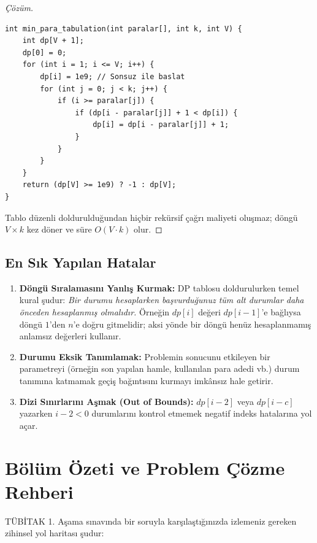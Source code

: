 \begin{proof}[Çözüm]
\begin{lstlisting}[language=CTemel]
int min_para_tabulation(int paralar[], int k, int V) {
    int dp[V + 1];
    dp[0] = 0;
    for (int i = 1; i <= V; i++) {
        dp[i] = 1e9; // Sonsuz ile baslat
        for (int j = 0; j < k; j++) {
            if (i >= paralar[j]) {
                if (dp[i - paralar[j]] + 1 < dp[i]) {
                    dp[i] = dp[i - paralar[j]] + 1;
                }
            }
        }
    }
    return (dp[V] >= 1e9) ? -1 : dp[V];
}
\end{lstlisting}
Tablo düzenli doldurulduğundan hiçbir rekürsif çağrı maliyeti oluşmaz; döngü $V \times k$ kez döner ve süre $O(V \cdot k)$ olur.
\end{proof}

\subsection*{En Sık Yapılan Hatalar}
\begin{enumerate}
    \item \textbf{Döngü Sıralamasını Yanlış Kurmak:} DP tablosu doldurulurken temel kural şudur: \emph{Bir durumu hesaplarken başvurduğunuz tüm alt durumlar daha önceden hesaplanmış olmalıdır.} Örneğin $dp[i]$ değeri $dp[i-1]$'e bağlıysa döngü $1$'den $n$'e doğru gitmelidir; aksi yönde bir döngü henüz hesaplanmamış anlamsız değerleri kullanır.
    \item \textbf{Durumu Eksik Tanımlamak:} Problemin sonucunu etkileyen bir parametreyi (örneğin son yapılan hamle, kullanılan para adedi vb.) durum tanımına katmamak geçiş bağıntısını kurmayı imkânsız hale getirir.
    \item \textbf{Dizi Sınırlarını Aşmak (Out of Bounds):} $dp[i-2]$ veya $dp[i-c]$ yazarken $i-2 < 0$ durumlarını kontrol etmemek negatif indeks hatalarına yol açar.
\end{enumerate}

\section{Bölüm Özeti ve Problem Çözme Rehberi}

TÜBİTAK 1. Aşama sınavında bir soruyla karşılaştığınızda izlemeniz gereken zihinsel yol haritası şudur:

